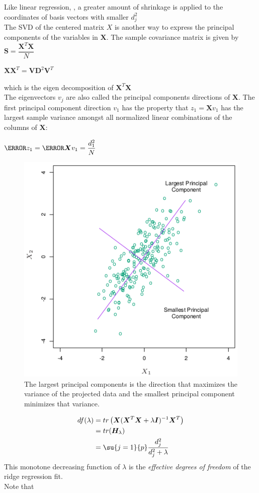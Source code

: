 Like linear regression,  , a greater
amount of shrinkage is applied to the coordinates of basis vectors with
smaller $d_{j}^{2}$\\
The SVD of the centered matrix $X$ is another way to express the 
principal components of the variables in $\bm{X}$. The sample 
covariance matrix is given by $\bm{S}=\dfrac{\bm{X}^{T}\bm{X}}{N}$
\begin{center}
	$\bm{X}\bm{X}^{T}=\bm{V}\bm{D}^{2}\bm{V}^{T}$
\end{center}
which is the eigen decomposition of $\bm{X}^{T}\bm{X}$\\
The eigenvectors $v_{j}$ are also called the principal components 
directions of $\bm{X}$. The first principal component direction 
$v_{1}$ has the property that $z_{1}=\bm{X}v_{1}$ has the largest
sample variance amongst all normalized linear combinations of the 
columns of $\bm{X}$:
\begin{center}
	$\V{z_{1}}=\V{\bm{X}v_{1}}=\dfrac{d_{1}^{2}}{N}$
\end{center}
\begin{figure}[H]
	\begin{center}
		\includegraphics[width=.5\textwidth]{./chap/1chap/5sec/images/4_PrincipalComponentsRidge.png}
	\end{center}
	\caption{The largest principal components is the direction that
	maximizes the variance of the projected data and the smallest
	principal component minimizes that variance.
	}
	\label{fig:5.4_PrincipalComponentsRidge}
\end{figure}
\begin{align*}
	df(\lambda) &=tr\left(\bm{X}(\bm{X}^{T}\bm{X}+\lambda\bm{I})^{-1}\bm{X}^{T}\right)\\
	&= tr(\bm{H}_{\lambda})\\
	&= \su{{j=1}}{p}\dfrac{d_{j}^{2}}{d_{j}^{2}+\lambda}
\end{align*}
This monotone decreasing function of $\lambda$ is the \emph{effective
degrees of freedom} of the ridge regression fit.\\
Note that 

